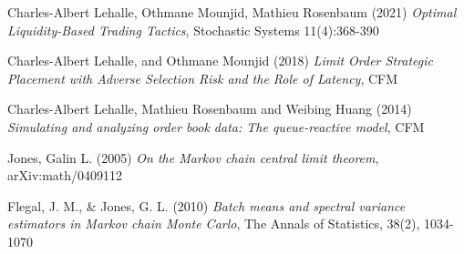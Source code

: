 \documentclass[12pt,a4paper]{article}
\theoremstyle{definition}
\theoremstyle{remark}
\begin{document}
    
    \newpage
    \begin{thebibliography}{9}

    Charles-Albert Lehalle, Othmane Mounjid, Mathieu Rosenbaum (2021)
    \textit{Optimal Liquidity-Based Trading Tactics},
    Stochastic Systems 11(4):368-390

    Charles-Albert Lehalle, and Othmane Mounjid (2018)
    \textit{Limit Order Strategic Placement with Adverse Selection Risk and the Role of Latency},
    CFM

    Charles-Albert Lehalle, Mathieu Rosenbaum and Weibing Huang (2014)
    \textit{Simulating and analyzing order book data: The queue-reactive model},
    CFM

    Jones, Galin L. (2005)
    \textit{On the Markov chain central limit theorem},
    arXiv:math/0409112

Flegal, J. M., & Jones, G. L. (2010)
\textit{Batch means and spectral variance estimators in Markov chain Monte Carlo},
The Annals of Statistics, 38(2), 1034-1070


    \end{thebibliography}
\end{document}

